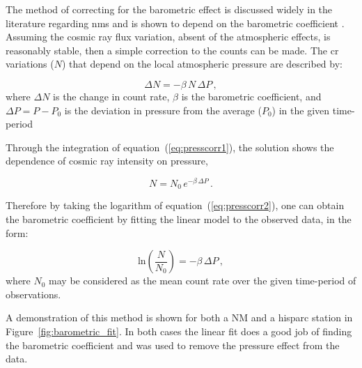 The method of correcting for the barometric effect is discussed widely in the literature regarding \glspl{nm} and is shown to depend on the barometric coefficient \citep{paschalis_online_2013}. Assuming the cosmic ray flux variation, absent of the atmospheric effects, is reasonably stable, then a simple correction to the counts can be made. The \gls{cr} variations ($N$) that depend on the local atmospheric pressure are described by:

\begin{equation}
\Delta N = - \beta \, N \, \Delta P \, ,
\label{eq:presscorr1}
\end{equation}
%
where $\Delta N$ is the change in count rate, $\beta$ is the barometric coefficient, and $\Delta P = P - P_0$ is the deviation in pressure from the average ($P_0$) in the given time-period \citep{paschalis_online_2013}

Through the integration of equation~(\ref{eq:presscorr1}), the solution shows the dependence of cosmic ray intensity on pressure,

\begin{equation}
N = N_{0} \, e^{-\beta \, \Delta P} \, .
\label{eq:presscorr2}
\end{equation}

Therefore by taking the logarithm of equation~(\ref{eq:presscorr2}), one can obtain the barometric coefficient by fitting the linear model to the observed data, in the form:

\begin{equation}
\mathrm{ln} \left( \frac{N}{N_0} \right) = - \beta \, \Delta P \, ,
\label{eq:presscorr3}
\end{equation}
%
where $N_0$ may be considered as the mean count rate over the given time-period of observations.

A demonstration of this method is shown for both a NM and a \gls{hisparc} station in Figure~\ref{fig:barometric_fit}. In both cases the linear fit does a good job of finding the barometric coefficient and was used to remove the pressure effect from the data.

